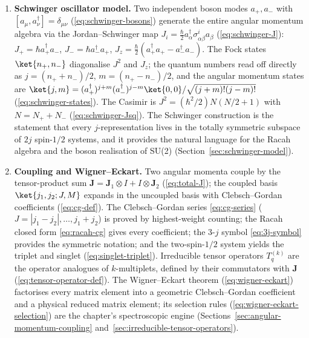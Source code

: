 \begin{enumerate}
\item[\textbf{(R-Y)}] \textbf{Schwinger oscillator model.} Two independent boson modes $a_+, a_-$ with $[a_\mu,a_\nu^\dagger] = \delta_{\mu\nu}$ (\eqref{eq:schwinger-bosons}) generate the entire angular momentum algebra via the Jordan--Schwinger map $J_i = \frac{\hbar}{2} a_\alpha^\dagger\sigma^i_{\alpha\beta}a_\beta$ (\eqref{eq:schwinger-J}): $J_+ = \hbar a_+^\dagger a_-$, $J_- = \hbar a_-^\dagger a_+$, $J_z = \frac{\hbar}{2}(a_+^\dagger a_+ - a_-^\dagger a_-)$. The Fock states $\ket{n_+,n_-}$ diagonalise $J^2$ and $J_z$; the quantum numbers read off directly as $j = (n_++n_-)/2$, $m = (n_+-n_-)/2$, and the angular momentum states are $\ket{j,m} = (a_+^\dagger)^{j+m}(a_-^\dagger)^{j-m}\ket{0,0}/\sqrt{(j+m)!(j-m)!}$ (\eqref{eq:schwinger-states}). The Casimir is $J^2 = (\hbar^2/2)N(N/2+1)$ with $N = N_++N_-$ (\eqref{eq:schwinger-Jsq}). The Schwinger construction is the statement that every $j$-representation lives in the totally symmetric subspace of $2j$ spin-$1/2$ systems, and it provides the natural language for the Racah algebra and the boson realisation of SU(2) (Section~\ref{sec:schwinger-model}).

\item[\textbf{(R5)}] \textbf{Coupling and Wigner--Eckart.} Two angular momenta couple by the tensor-product sum $\bm J = \bm J_1\otimes I + I\otimes\bm J_2$ (\eqref{eq:total-J}); the coupled basis $\ket{j_1,j_2;J,M}$ expands in the uncoupled basis with Clebsch--Gordan coefficients (\eqref{eq:cg-def}). The Clebsch--Gordan series \eqref{eq:cg-series} ($J = |j_1-j_2|,\ldots,j_1+j_2$) is proved by highest-weight counting; the Racah closed form \eqref{eq:racah-cg} gives every coefficient; the 3-$j$ symbol \eqref{eq:3j-symbol} provides the symmetric notation; and the two-spin-$1/2$ system yields the triplet and singlet (\eqref{eq:singlet-triplet}). Irreducible tensor operators $T^{(k)}_q$ are the operator analogues of $k$-multiplets, defined by their commutators with $\bm J$ (\eqref{eq:tensor-operator-def}). The Wigner--Eckart theorem (\eqref{eq:wigner-eckart}) factorises every matrix element into a geometric Clebsch--Gordan coefficient and a physical reduced matrix element; its selection rules (\eqref{eq:wigner-eckart-selection}) are the chapter's spectroscopic engine (Sections~\ref{sec:angular-momentum-coupling} and~\ref{sec:irreducible-tensor-operators}).
\end{enumerate}

